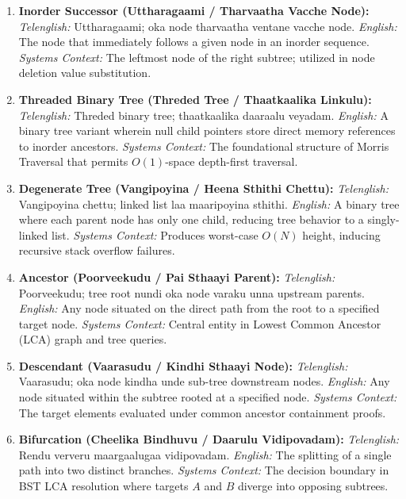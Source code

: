 \documentclass[10pt,twocolumn,letterpaper]{article}
\begin{document}
\begin{enumerate}
    \item \textbf{Inorder Successor (Uttharagaami / Tharvaatha Vacche Node):}
    \textit{Telenglish:} Uttharagaami; oka node tharvaatha ventane vacche node.
    \textit{English:} The node that immediately follows a given node in an inorder sequence.
    \textit{Systems Context:} The leftmost node of the right subtree; utilized in node deletion value substitution.

    \item \textbf{Threaded Binary Tree (Threded Tree / Thaatkaalika Linkulu):}
    \textit{Telenglish:} Threded binary tree; thaatkaalika daaraalu veyadam.
    \textit{English:} A binary tree variant wherein null child pointers store direct memory references to inorder ancestors.
    \textit{Systems Context:} The foundational structure of Morris Traversal that permits $O(1)$-space depth-first traversal.

    \item \textbf{Degenerate Tree (Vangipoyina / Heena Sthithi Chettu):}
    \textit{Telenglish:} Vangipoyina chettu; linked list laa maaripoyina sthithi.
    \textit{English:} A binary tree where each parent node has only one child, reducing tree behavior to a singly-linked list.
    \textit{Systems Context:} Produces worst-case $O(N)$ height, inducing recursive stack overflow failures.

    \item \textbf{Ancestor (Poorveekudu / Pai Sthaayi Parent):}
    \textit{Telenglish:} Poorveekudu; tree root nundi oka node varaku unna upstream parents.
    \textit{English:} Any node situated on the direct path from the root to a specified target node.
    \textit{Systems Context:} Central entity in Lowest Common Ancestor (LCA) graph and tree queries.

    \item \textbf{Descendant (Vaarasudu / Kindhi Sthaayi Node):}
    \textit{Telenglish:} Vaarasudu; oka node kindha unde sub-tree downstream nodes.
    \textit{English:} Any node situated within the subtree rooted at a specified node.
    \textit{Systems Context:} The target elements evaluated under common ancestor containment proofs.

    \item \textbf{Bifurcation (Cheelika Bindhuvu / Daarulu Vidipovadam):}
    \textit{Telenglish:} Rendu ververu maargaalugaa vidipovadam.
    \textit{English:} The splitting of a single path into two distinct branches.
    \textit{Systems Context:} The decision boundary in BST LCA resolution where targets $A$ and $B$ diverge into opposing subtrees.


\end{enumerate}
\end{document}
